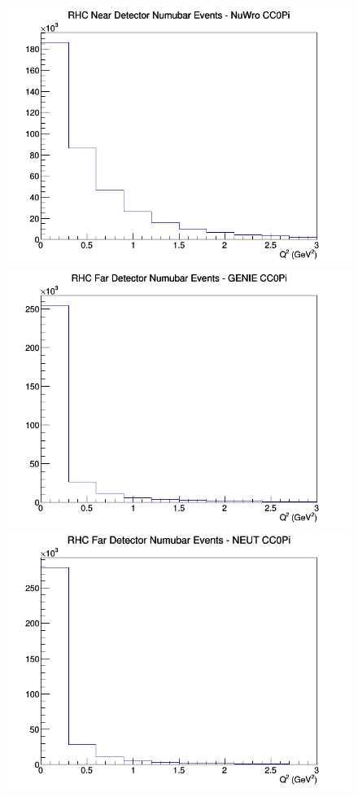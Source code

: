 \begin{figure}[h]
\includegraphics[width=\linewidth]{eff_Q2/LAr/CC0Pi_RHC_ND_numubar_Q2_NuWro.png}
\endminipage
\newline
{}
\includegraphics[width=\linewidth]{eff_Q2/LAr/CC0Pi_RHC_FD_numubar_Q2_GENIE.png}
\endminipage
{}
\includegraphics[width=\linewidth]{eff_Q2/LAr/CC0Pi_RHC_FD_numubar_Q2_NEUT.png}

\end{figure}
